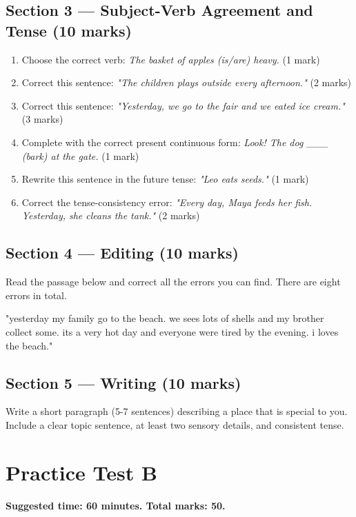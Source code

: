 \subsection*{Section 3 — Subject-Verb Agreement and Tense (10 marks)}
\begin{enumerate}
    \item Choose the correct verb: \textit{The basket of apples (is/are) heavy.} (1 mark)
    \item Correct this sentence: \textit{"The children plays outside every afternoon."} (2 marks)
    \item Correct this sentence: \textit{"Yesterday, we go to the fair and we eated ice cream."} (3 marks)
    \item Complete with the correct present continuous form: \textit{Look! The dog \_\_\_ (bark) at the gate.} (1 mark)
    \item Rewrite this sentence in the future tense: \textit{"Leo eats seeds."} (1 mark)
    \item Correct the tense-consistency error: \textit{"Every day, Maya feeds her fish. Yesterday, she cleans the tank."} (2 marks)
\end{enumerate}

\subsection*{Section 4 — Editing (10 marks)}
Read the passage below and correct all the errors you can find. There are eight errors in total.
\begin{tcolorbox}[colback=gray!5, colframe=gray!50, sharp corners, boxsep=0pt, left=5pt, right=5pt, top=5pt, bottom=5pt, breakable]
"yesterday my family go to the beach. we sees lots of shells and my brother collect some. its a very hot day and everyone were tired by the evening. i loves the beach."
\end{tcolorbox}

\subsection*{Section 5 — Writing (10 marks)}
Write a short paragraph (5-7 sentences) describing a place that is special to you. Include a clear topic sentence, at least two sensory details, and consistent tense.

\section{Practice Test B}
\textbf{Suggested time: 60 minutes. Total marks: 50.}

